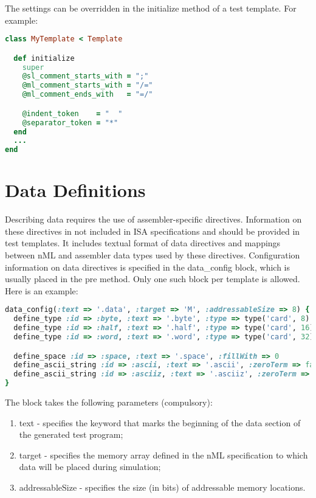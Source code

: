 \documentclass[oneside,final,14pt]{extreport}
\begin{document}
The settings can be overridden in the initialize method of a test template. For example:

\begin{lstlisting}[language=ruby]
class MyTemplate < Template

  def initialize
    super
    @sl_comment_starts_with = ";" 
    @ml_comment_starts_with = "/="
    @ml_comment_ends_with   = "=/"

    @indent_token    = "  "
    @separator_token = "*" 
  end
  ...
end
\end{lstlisting}


\section{Data Definitions}

Describing data requires the use of assembler-specific directives. Information on
these directives in not included in ISA specifications and should be provided in test
templates. It includes textual format of data directives and mappings between nML and
assembler data types used by these directives. Configuration information on data
directives is specified in the data{\_}config block, which is usually placed in the
pre method. Only one such block per template is allowed. Here is an example:

\begin{lstlisting}[language=ruby]
data_config(:text => '.data', :target => 'M', :addressableSize => 8) {
  define_type :id => :byte, :text => '.byte', :type => type('card', 8)
  define_type :id => :half, :text => '.half', :type => type('card', 16)
  define_type :id => :word, :text => '.word', :type => type('card', 32)

  define_space :id => :space, :text => '.space', :fillWith => 0
  define_ascii_string :id => :ascii, :text => '.ascii', :zeroTerm => false
  define_ascii_string :id => :asciiz, :text => '.asciiz', :zeroTerm => true
}
\end{lstlisting}

The block takes the following parameters (compulsory):

\begin{enumerate}
  \item text - specifies the keyword that marks the beginning of the data section
        of the generated test program;

  \item target - specifies the memory array defined in the nML specification to
        which data will be placed during simulation;

  \item addressableSize - specifies the size (in bits) of addressable memory locations.
\end{enumerate}
\end{document}
